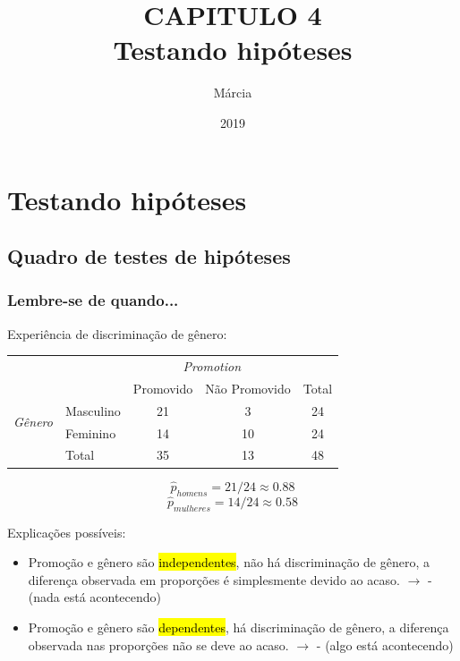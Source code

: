 \documentclass[11pt]{beamer}
\title{CAPITULO 4 \\ Testando hipóteses}
\author{Márcia}
\institute{Instituto de Matemática e Estatística \\Faculdade de Estatística}
\date{2019}
\begin{document}
\maketitle


\section{Testando hipóteses}


\subsection{Quadro de testes de hipóteses}


\begin{frame}
\frametitle{Lembre-se de quando...}

Experiência de discriminação de gênero:

{\small
\begin{tabular}{ll  cc c} 
  		&				& \multicolumn{2}{c}{\textit{Promotion}} \\
\cline{3-4}
							&			& Promovido	& Não Promovido	& Total	\\
\cline{2-5}
\multirow{2}{*}{\textit{Gênero	}}	&Masculino 		& 21	 	& 3		& 24 	\\
							&Feminino		& 14	 	& 10 	 	& 24 \\
\cline{2-5}
							&Total		& 35		& 13		& 48 \\
\end{tabular}
}

\pause

\[ \hat{p}_{homens} = 21 / 24 \approx 0.88 \]
\[ \hat{p}_{mulheres} = 14 / 24 \approx 0.58 \]

\pause

Explicações possíveis:
\begin{itemize}
\item Promoção e gênero são \hl{independentes}, não há discriminação de gênero, a diferença observada em proporções é simplesmente devido ao acaso. $\rightarrow$  - {\small (nada está acontecendo)}
\item Promoção e gênero são \hl{dependentes}, há discriminação de gênero, a diferença observada nas proporções não se deve ao acaso. $\rightarrow$  - {\small (algo está acontecendo)}

\end{itemize}

\end{frame}
\end{document}
